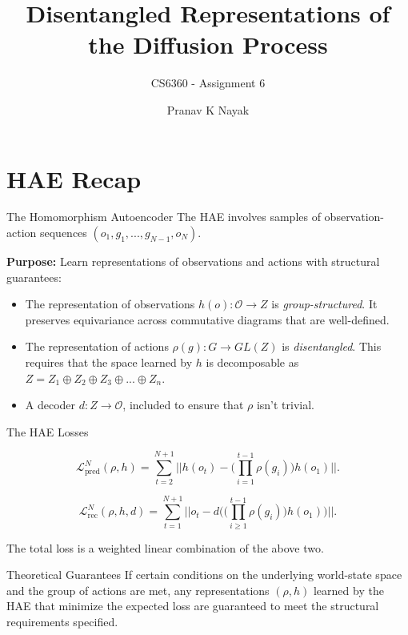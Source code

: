 \documentclass{beamer}
\title{Disentangled Representations of the Diffusion Process}
\subtitle{CS6360 - Assignment 6}
\author{Pranav K Nayak}
\institute{IIT Hyderabad}
\date{}
\begin{document}
\begin{frame}{}
  \titlepage
\end{frame}
\begin{frame}
\tableofcontents
\end{frame}
\section{HAE Recap}
\begin{frame}{The Homomorphism Autoencoder}
The HAE involves samples of observation-action sequences $(o_1, g_1, ..., g_{N-1}, o_N)$. 

\textbf{Purpose:} Learn representations of observations and actions with structural guarantees:
\pause
\begin{itemize}[<alert@+>]
\item The representation of observations $h(o): \mathcal{O} \rightarrow Z$ is \textit{group-structured}. It preserves equivariance across commutative diagrams that are well-defined.
\item The representation of actions $\rho(g): G \rightarrow GL(Z)$ is \textit{disentangled}. This requires that the space learned by $h$ is decomposable as $Z = Z_1 \oplus Z_2 \oplus Z_3 \oplus ... \oplus Z_n$.
\item A decoder $d: Z \rightarrow \mathcal{O}$, included to ensure that $\rho$ isn't trivial.
\end{itemize}
\end{frame}
\begin{frame}{The HAE Losses}
  \begin{definition}
    \[ 
    \mathcal{L}_{\text{pred}}^N(\rho, h) = \sum_{t = 2 }^{N+1} \bigl|\bigl| h(o_t) - \bigl(\prod_{i = 1 }^{t - 1 }\rho(g_i) \bigr)h(o_1) \bigr|\bigr|
    .\]
    
  \end{definition}
  \begin{definition}
    \[ 
    \mathcal{L}_{\text{rec}}^N(\rho, h, d) = \sum_{t = 1 }^{N+1} \bigl|\bigl| o_t - d \biggl(\bigl(\prod_{i \geq 1 }^{t - 1 }\rho(g_i) \bigr)h(o_1)\biggr) \bigr|\bigr|
    .\]
  \end{definition}
   The total loss is a weighted linear combination of the above two. 
\end{frame}
\begin{frame}{Theoretical Guarantees}
If certain conditions on the underlying world-state space and the group of actions are met, any representations $(\rho, h)$ learned by the HAE that minimize the expected loss are guaranteed to meet the structural requirements specified.
\end{frame}
\end{document}
